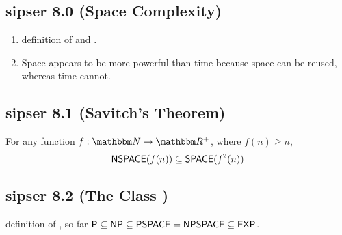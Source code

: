 \documentclass{article}
\begin{document}
\subsection{sipser 8.0 (Space Complexity)}

\begin{enumerate}
  \item definition of \SPACE and \NSPACE.
  \item Space appears to be more powerful than time because space can be reused, whereas time cannot.
\end{enumerate}

\subsection{sipser 8.1 (Savitch's Theorem)}

\begin{theorem}
  For any function \(f: \N \to \R^+\), where \(f(n) \geq n\),
  \[ \text{\sf NSPACE}(f(n)) \subseteq \text{\sf SPACE}(f^2(n)) \]
\end{theorem}

\subsection{sipser 8.2 (The Class \PSPACE)}

definition of \PSPACE, so far \( \text{\sf P} \subseteq \text{\sf NP} \subseteq \text{\sf PSPACE} = \text{\sf NPSPACE} \subseteq \text{\sf EXP} \).
\end{document}
